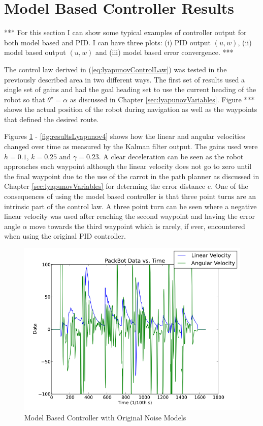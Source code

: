 \section{Model Based Controller Results}
\label{sec:lyapunovResults}
*** For this section I can show some typical examples of controller output for both model based and PID. I can have three plots: (i) PID output $(u,w)$, (ii) model based output $(u,w)$ and (iii) model based error convergence. ***

The control law derived in (\ref{eq:lyapunovControlLaw}) was tested in the previously described area in two different ways. The first set of results used a single set of gains and had the goal heading set to use the current heading of the robot so that $\theta^\star=\alpha$ as discussed in Chapter \ref{sec:lyapunovVariables}. Figure *** shows the actual position of the robot during navigation as well as the waypoints that defined the desired route.

Figures \ref{fig:resultsLyapunov1} - \ref{fig:resultsLyapunov4} shows how the linear and angular velocities changed over time as measured by the Kalman filter output. The gains used were $h=0.1$, $k=0.25$ and $\gamma=0.23$. A clear deceleration can be seen as the robot approaches each waypoint although the linear velocity does not go to zero until the final waypoint due to the use of the carrot in the path planner as discussed in Chapter \ref{sec:lyapunovVariables} for determing the error distance $e$. One of the consequences of using the model based controller is that three point turns are an intrinsic part of the control law. A three point turn can be seen where a negative linear velocity was used after reaching the second waypoint and having the error angle $\alpha$ move towards the third waypoint which is rarely, if ever, encountered when using the original PID controller.

\begin{figure}[ht!]
	\centering
	\includegraphics[width=.5\textwidth]{images/pbtx/20101203_1551_pbtxLyapOrigQR}
	\caption{Model Based Controller with Original Noise Models}
	\label{fig:resultsLyapunov1}
\end{figure}

